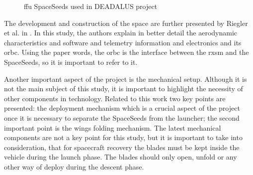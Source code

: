 \begin{figure}[!htb]
    \centering
    \hfill
    \caption{\gls{ffu} SpaceSeeds used in DEADALUS project}
    \label{fig:daedalus_ffu}
\end{figure}

The development and construction of the space are further presented by Riegler et al. in \cite{riegler_project_nodate}. In this study, the authors explain in better detail the aerodynamic characteristics and software and telemetry information and electronics and its \gls{orbc}. Using the paper words, the \gls{orbc} is the interface between the \gls{rxsm} and the SpaceSeeds, so it is important to refer to it. 

Another important aspect of the project is the mechanical setup. Although it is not the main subject of this study, it is important to highlight the necessity of other components in \cite{riegler_project_nodate} technology. Related to this work two key points are presented: the deployment mechanism which is a crucial aspect of the project once it is necessary to separate the SpaceSeeds from the launcher; the second important point is the wings folding mechanism. The latest mechanical components are not a key point for this study, but it is important to take into consideration, that for spacecraft recovery the blades must be kept inside the vehicle during the launch phase. The blades should only open, unfold or any other way of deploy during the descent phase.

